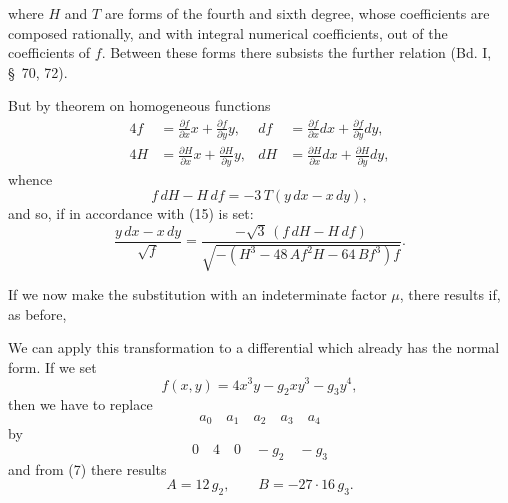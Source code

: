 
where $H$ and $T$ are forms of the fourth and sixth degree, whose
coefficients are composed rationally, and with integral numerical
coefficients, out of the coefficients of $f$. Between these
forms there subsists the further relation
(Bd. I, \S\ 70, 72).

But by  theorem on homogeneous
functions
\[
\begin{aligned}
4f&=\frac{\partial f}{\partial x}x+\frac{\partial f}{\partial y}y,
&df&=\frac{\partial f}{\partial x}dx+\frac{\partial f}{\partial y}dy,\\
4H&=\frac{\partial H}{\partial x}x+\frac{\partial H}{\partial y}y,
&dH&=\frac{\partial H}{\partial x}dx+\frac{\partial H}{\partial y}dy,
\end{aligned}
\]
whence
\[
f\,dH-H\,df=-3\,T(y\,dx-x\,dy),
\]
and so, if in accordance with (15)
is set:
\[
\frac{y\,dx-x\,dy}{\sqrt{f}} = \frac{-\sqrt{3}\,(f\,dH-H\,df)}{\sqrt{-(H^3-48\,Af^2H-64\,Bf^3)f}}.
\]

If we now make the substitution
with an indeterminate factor $\mu$, there results
if, as before,

We can apply this transformation to a differential
which already has the normal form. If we set
\[
f(x,y) = 4x^3y - g_2xy^3 - g_3y^4,
\]
then we have to replace
\[
a_0\quad a_1\quad a_2\quad a_3\quad a_4
\]
by
\[
0\quad 4\quad 0\quad -g_2\quad -g_3
\]
and from (7) there results
\[
A = 12\,g_2, \qquad B = -27\cdot 16\,g_3.
\]
